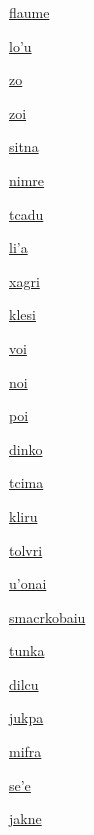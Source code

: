 {\hyperlink{val:flaume}{flaume}}{}{}{}

{\hyperlink{val:lohu}{lo'u}}{}{}{}

{\hyperlink{val:zo}{zo}}{}{}{}

{\hyperlink{val:zoi}{zoi}}{}{}{}

{\hyperlink{val:sitna}{sitna}}{}{}{}

{\hyperlink{val:nimre}{nimre}}{}{}{}

{\hyperlink{val:tcadu}{tcadu}}{}{}{}

{\hyperlink{val:liha}{li'a}}{}{}{}

{\hyperlink{val:xagri}{xagri}}{}{}{}

{\hyperlink{val:klesi}{klesi}}{}{}{}

{\hyperlink{val:voi}{voi}}{}{}{}

{\hyperlink{val:noi}{noi}}{}{}{}

{\hyperlink{val:poi}{poi}}{}{}{}

{\hyperlink{val:dinko}{dinko}}{}{}{}

{\hyperlink{val:tcima}{tcima}}{}{}{}

{\hyperlink{val:kliru}{kliru}}{}{}{}

{\hyperlink{val:tolvri}{tolvri}}{}{}{}

{\hyperlink{val:uhonai}{u'onai}}{}{}{}

{\hyperlink{val:smacrkobaiu}{smacrkobaiu}}{}{}{}

{\hyperlink{val:tunka}{tunka}}{}{}{}

{\hyperlink{val:dilcu}{dilcu}}{}{}{}

{\hyperlink{val:jukpa}{jukpa}}{}{}{}

{\hyperlink{val:mifra}{mifra}}{}{}{}

{\hyperlink{val:sehe}{se'e}}{}{}{}

{\hyperlink{val:jakne}{jakne}}{}{}{}

